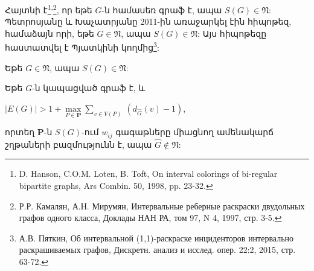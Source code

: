 Հայտնի է\footnote{D. Hanson, C.O.M. Loten, B. Toft, On interval colorings of bi-regular bipartite graphs, Ars Combin. 50, 1998, pp. 23-32.}\textsuperscript{,}\footnote{Р.Р. Камалян, А.Н. Мирумян, Интервальные реберные раскраски двудольных графов одного класса, Доклады НАН РА, том 97, N 4, 1997, стр. 3-5.}, որ եթե $G$-ն համասեռ գրաֆ է, ապա $S(G)\in \mathfrak{N}$: Պետրոսյանը և Խաչատրյանը 2011-ին առաջարկել էին հիպոթեզ, համաձայն որի, եթե $G\in \mathfrak{N}$, ապա $S(G)\in \mathfrak{N}$: Այս հիպոթեզը հաստատվել է Պյատկինի կողմից\footnote{А.В. Пяткин, Об интервальной (1,1)-раскраске инциденторов интервально раскрашиваемых графов, Дискретн. анализ и исслед. опер. 22:2, 2015, стр. 63-72.}:
\begin{hide}
\begin{hypothesis}
Եթե $G\in \mathfrak{N}$, ապա $S(G)\in \mathfrak{N}$:
\end{hypothesis}
\end{hide}
\begin{theorem}
\label{t3_subdivision_paths} Եթե $G$-ն կապացված գրաֆ է, և
\begin{center}
$\vert E(G)\vert
> 1+ {\max\limits_{P\in \mathbf{P}}}{\sum\limits_{v\in
V(P)}}\ \left(d_{\widehat{G}}(v)-1\right)$,
\end{center}
որտեղ $\mathbf{P}$-ն $S(G)$-ում $w_{ij}$ գագաթները միացնող ամենակարճ շղթաների բազմությունն է, ապա $\widehat{G}\notin \mathfrak{N}$:
\end{theorem}
